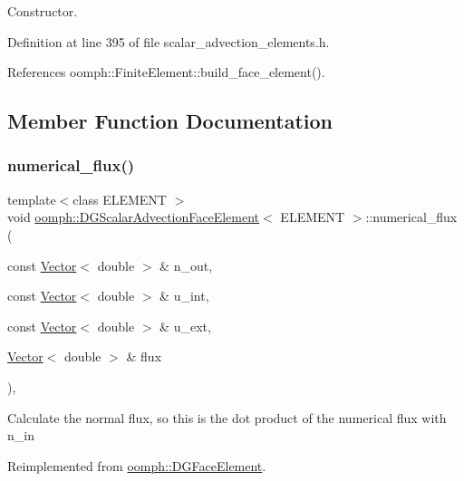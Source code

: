 Constructor. 



Definition at line 395 of file scalar\+\_\+advection\+\_\+elements.\+h.



References oomph\+::\+Finite\+Element\+::build\+\_\+face\+\_\+element().



\subsection{Member Function Documentation}
\mbox{\label{classoomph_1_1DGScalarAdvectionFaceElement_afdbb802744c914451223b5664bb589e4}} 
\subsubsection{\texorpdfstring{numerical\+\_\+flux()}{numerical\_flux()}}
{\footnotesize\ttfamily template$<$class E\+L\+E\+M\+E\+NT $>$ \\
void \hyperlink{classoomph_1_1DGScalarAdvectionFaceElement}{oomph\+::\+D\+G\+Scalar\+Advection\+Face\+Element}$<$ E\+L\+E\+M\+E\+NT $>$\+::numerical\+\_\+flux (\begin{DoxyParamCaption}\item[{const \hyperlink{classoomph_1_1Vector}{Vector}$<$ double $>$ \&}]{n\+\_\+out,  }\item[{const \hyperlink{classoomph_1_1Vector}{Vector}$<$ double $>$ \&}]{u\+\_\+int,  }\item[{const \hyperlink{classoomph_1_1Vector}{Vector}$<$ double $>$ \&}]{u\+\_\+ext,  }\item[{\hyperlink{classoomph_1_1Vector}{Vector}$<$ double $>$ \&}]{flux }\end{DoxyParamCaption})\hspace{0.3cm}{\ttfamily [inline]}, {\ttfamily [virtual]}}

Calculate the normal flux, so this is the dot product of the numerical flux with n\+\_\+in 

Reimplemented from \hyperlink{classoomph_1_1DGFaceElement_a023e05bcee73952fbc2c1f816a0a0860}{oomph\+::\+D\+G\+Face\+Element}.



